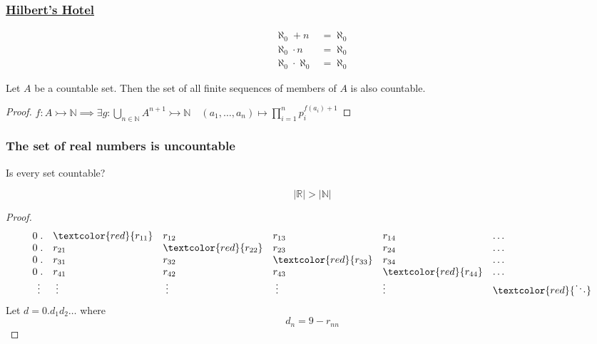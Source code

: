 \documentclass[UTF8,11pt,colorlinks,compress,openany]{beamer}%
\begin{document}
\begin{frame}\frametitle{\href{https://www.quora.com/What-if-I-requested-the-last-room-at-the-Hilberts-Hotel/answer/Alon-Amit?__snid3__=463182494&__nsrc__=2&__filter__=&from=timeline}{Hilbert's Hotel}}
	\begin{align*}
	\aleph_0+n&=\aleph_0\\
	\aleph_0\cdot n&=\aleph_0\\
	\aleph_0\cdot\aleph_0&=\aleph_0
	\end{align*}
	\begin{theorem}
		Let $A$ be a countable set. Then the set of all finite sequences of members of $A$ is also countable.
	\end{theorem}
	\begin{proof}
		$f: A\rightarrowtail\mathbb{N}\implies\exists g:\bigcup\limits_{n\in\mathbb{N}} A^{n+1}\rightarrowtail\mathbb{N}\quad(a_1,\dots,a_n)\mapsto\prod\limits_{i=1}^n p_i^{f(a_i)+1}$
	\end{proof}
\end{frame}

\begin{frame}\frametitle{The set of real numbers is uncountable}
	\begin{center}
		Is every set countable?
	\end{center}
	\begin{theorem}[Cantor]
		\[|\mathbb{R}|>|\mathbb{N}|\]
	\end{theorem}
\setlength\abovedisplayskip{0pt}
\setlength\belowdisplayskip{0pt}
	\begin{proof}
		\[
		\begin{array}{rlllll}
		0\;.&\textcolor{red}{r_{11}}&r_{12}&r_{13}&r_{14}&\dots\\
		0\;.&r_{21}&\textcolor{red}{r_{22}}&r_{23}&r_{24}&\dots\\
		0\;.&r_{31}&r_{32}&\textcolor{red}{r_{33}}&r_{34}&\dots\\
		0\;.&r_{41}&r_{42}&r_{43}&\textcolor{red}{r_{44}}&\dots\\
		\vdots\; & \;\vdots&\;\vdots&\;\vdots\;&\vdots&\textcolor{red}{\ddots}
		\end{array}
		\]
		Let $d=0.d_1 d_2\dots$ where
		\[d_n=9-r_{nn}\]
	\end{proof}
\end{frame}
\end{document}

